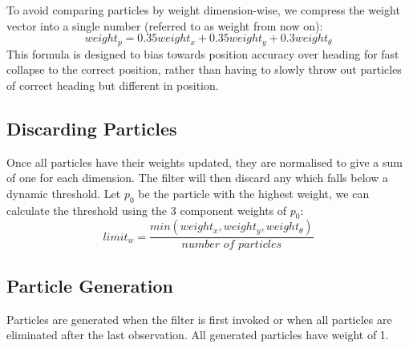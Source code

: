 \documentclass[pdftex,11pt,a4paper]{report}
\begin{document}
To avoid comparing particles by weight dimension-wise, we compress the weight vector into a single number (referred to as weight from now on):
\begin{equation}
  weight_p = 0.35weight_x + 0.35weight_y + 0.3weight_\theta
\end{equation}
This formula is designed to bias towards position accuracy over heading for fast collapse to the correct position, rather than having to slowly throw out particles of correct heading but different in position.

\subsection{Discarding Particles}

Once all particles have their weights updated, they are normalised to give a sum of one for each dimension. The filter will then discard any which falls below a dynamic threshold. Let $p_0$ be the particle with the highest weight, we can calculate the threshold using the 3 component weights of $p_0$:   
\begin{equation}
  limit_w = \frac{min(weight_x, weight_y, weight_\theta)}{\textit{number of particles}}
\end{equation}

\subsection{Particle Generation}

Particles are generated when the filter is first invoked or when all particles are eliminated after the last observation. All generated particles have weight of 1.
\end{document}
